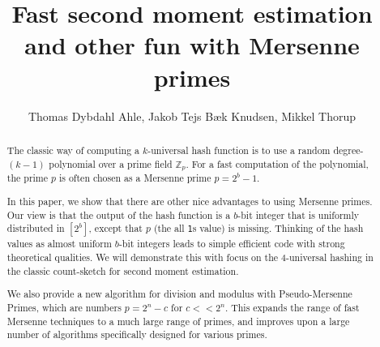

\title{Fast second moment estimation and other fun with Mersenne primes} 
\author{Thomas Dybdahl Ahle, Jakob Tejs Bæk Knudsen, Mikkel Thorup}

\maketitle

\begin{abstract}
The classic way of computing a $k$-universal hash function is
to use a random degree-$(k-1)$ polynomial over a prime field $\mathbb Z_p$.
For a fast computation of the polynomial, the prime $p$ is often
chosen as a Mersenne prime $p=2^b-1$.

In this paper, we show that there are other nice advantages to using
Mersenne primes. Our view is that the output of the hash function is a
$b$-bit integer that is uniformly distributed in $[2^b]$, except that
$p$ (the all \texttt1s value) is missing. Thinking of the hash
values as almost uniform $b$-bit integers leads to simple efficient code 
with strong theoretical qualities. We will demonstrate this with focus on the
4-universal hashing in the classic count-sketch for second moment
estimation.

We also provide a new algorithm for division and modulus with Pseudo-Mersenne Primes, which are numbers $p=2^n-c$ for $c<\!< 2^n$.
This expands the range of fast Mersenne techniques to a much large range of primes, and improves upon a large number of algorithms specifically designed for various primes.
\end{abstract}

\tableofcontents

















